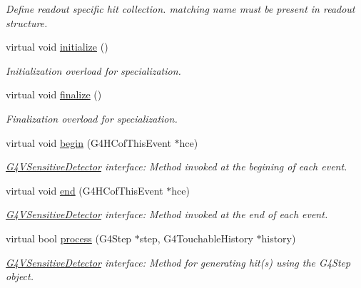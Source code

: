 \begin{DoxyCompactItemize}
\begin{DoxyCompactList}\small\item\em Define readout specific hit collection. matching name must be present in readout structure. \item\end{DoxyCompactList}\item 
virtual void \hyperlink{class_d_d4hep_1_1_simulation_1_1_geant4_sensitive_action_a6f4a254db9610da9e0a9b8c0a66a20da}{initialize} ()
\begin{DoxyCompactList}\small\item\em Initialization overload for specialization. \item\end{DoxyCompactList}\item 
virtual void \hyperlink{class_d_d4hep_1_1_simulation_1_1_geant4_sensitive_action_acf98c9d63c8703544da1e68b6c1abeae}{finalize} ()
\begin{DoxyCompactList}\small\item\em Finalization overload for specialization. \item\end{DoxyCompactList}\item 
virtual void \hyperlink{class_d_d4hep_1_1_simulation_1_1_geant4_sensitive_action_a2e9739b3741bb245e3cc7edb41e7374d}{begin} (G4HCofThisEvent $\ast$hce)
\begin{DoxyCompactList}\small\item\em \hyperlink{class_g4_v_sensitive_detector}{G4VSensitiveDetector} interface: Method invoked at the begining of each event. \item\end{DoxyCompactList}\item 
virtual void \hyperlink{class_d_d4hep_1_1_simulation_1_1_geant4_sensitive_action_a144120acdde58a966bd627c572ca191d}{end} (G4HCofThisEvent $\ast$hce)
\begin{DoxyCompactList}\small\item\em \hyperlink{class_g4_v_sensitive_detector}{G4VSensitiveDetector} interface: Method invoked at the end of each event. \item\end{DoxyCompactList}\item 
virtual bool \hyperlink{class_d_d4hep_1_1_simulation_1_1_geant4_sensitive_action_a36759982ed0876a5ce81c14973c18077}{process} (G4Step $\ast$step, G4TouchableHistory $\ast$history)
\begin{DoxyCompactList}\small\item\em \hyperlink{class_g4_v_sensitive_detector}{G4VSensitiveDetector} interface: Method for generating hit(s) using the G4Step object. \item\end{DoxyCompactList}\item 

\end{DoxyCompactItemize}
